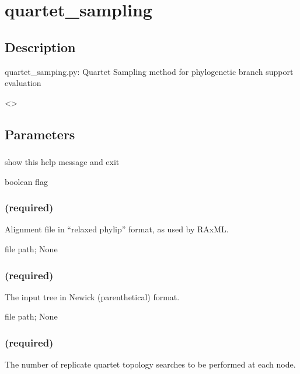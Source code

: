 \documentclass[letterpaper,12pt,english]{sphinxmanual}
\begin{document}
\section{quartet\_sampling}
\label{\detokenize{prog_desc:quartet-sampling}}

\subsection{Description}
\label{\detokenize{prog_desc:description}}
quartet\_samping.py: Quartet Sampling method for
phylogenetic branch support evaluation

\textless{}\textgreater{}


\subsection{Parameters}
\label{\detokenize{prog_desc:parameters}}

\subsubsection{}
\label{\detokenize{prog_desc:h-help}}
 show this help message and exit

 boolean flag


\subsubsection{ (required)}
\label{\detokenize{prog_desc:a-alignment-required}}
 Alignment file in “relaxed phylip” format, as used by RAxML.

 file path;  None


\subsubsection{ (required)}
\label{\detokenize{prog_desc:t-tree-required}}
 The input tree in Newick (parenthetical) format.

 file path;  None


\subsubsection{ (required)}
\label{\detokenize{prog_desc:n-number-of-reps-required}}
 The number of replicate quartet topology searches to be performed at each node.
\end{document}
